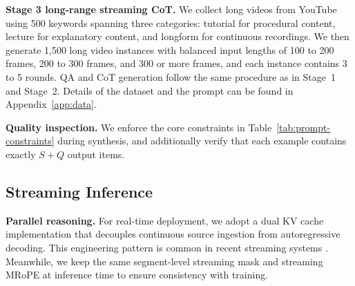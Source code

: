 \documentclass{article}
\begin{document}
\noindent\textbf{Stage 3 long-range streaming CoT.}
We collect long videos from YouTube using 500 keywords spanning three categories: tutorial for procedural content, lecture for explanatory content, and longform for continuous recordings. We then generate 1,500 long video instances with balanced input lengths of 100 to 200 frames, 200 to 300 frames, and 300 or more frames, and each instance contains 3 to 5 rounds. QA and CoT generation follow the same procedure as in Stage~1 and Stage~2. Details of the dataset and the prompt can be found in Appendix~\ref{app:data}.

\noindent\textbf{Quality inspection.}
We enforce the core constraints in Table~\ref{tab:prompt-constraints} during synthesis, and additionally verify that each example contains exactly $S+Q$ output items.

\begin{table}[t]
\caption{\textbf{Dataset statistics across three training stages.} Stages 1\&2 are built from VideoChatOnline-IT short videos, while Stage~3 contains long-range multi-round dialogues from YouTube. Video duration is reported in seconds (min/avg/max).}
\label{tab:data}
\centering
\scriptsize
\setlength{\tabcolsep}{3.5pt}
\renewcommand{\arraystretch}{1.05}
\end{table}

\subsection{Streaming Inference}
\label{sec:method:infer}

\noindent\textbf{Parallel reasoning.}
For real-time deployment, we adopt a dual KV cache implementation that decouples continuous source ingestion from autoregressive decoding. This engineering pattern is common in recent streaming systems \cite{DBLP:journals/corr/abs-2510-17238}. Meanwhile, we keep the same segment-level streaming mask and streaming MRoPE at inference time to ensure consistency with training.
\end{document}
